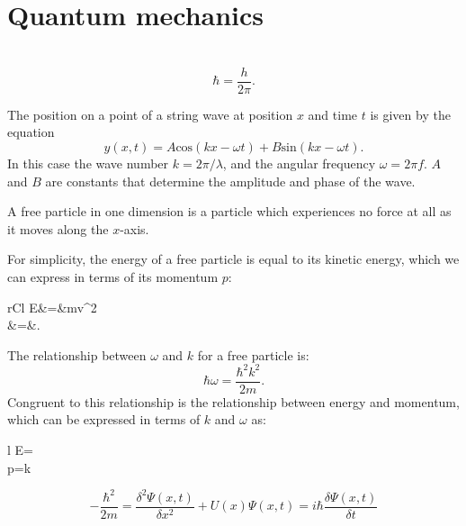 \documentclass[nobib,notoc]{tufte-handout}
\begin{document}
\section{Quantum mechanics}
\begin{defi}
	\,
	\begin{equation*}
		\hbar=\frac{h}{2\pi}.
	\end{equation*}
\end{defi}
\begin{defi}
	The position on a point of a string wave at position \(x\) and time \(t\) is given by the equation
	\begin{equation*}
		y(x,t)=A\text{cos}(kx-\omega t)+B\text{sin}(kx-\omega t).
	\end{equation*}
	In this case the wave number \(k=2\pi/\lambda\), and the angular frequency \(\omega=2\pi f\). \(A\) and \(B\) are constants that determine the amplitude and phase of the wave.
\end{defi}
\begin{defi}
	A free particle in one dimension is a particle which experiences no force at all as it moves along the \(x\)-axis.
\end{defi}
\begin{rema}
	For simplicity, the energy of a free particle is equal to its kinetic energy, which we can express in terms of its momentum \(p\):
	\begin{IEEEeqnarray*}{rCl}
		E&=&mv^2\\
		&=&.
	\end{IEEEeqnarray*}
	The relationship between \(\omega\) and \(k\) for a free particle is:
	\begin{equation*}
		\hbar\omega=\frac{\hbar^2k^2}{2m}.
	\end{equation*}
	Congruent to this relationship is the relationship between energy and momentum, which can be expressed in terms of \(k\) and \(\omega\) as:
	\begin{IEEEeqnarray*}{l}
		E=\hbar\omega\\
		p=\hbar k
	\end{IEEEeqnarray*}
\end{rema}
\begin{defi}
	\begin{equation*}
		-\frac{\hbar^2}{2m}=\frac{\delta^2\Psi(x,t)}{\delta x^2}+U(x)\Psi(x,t)=i\hbar\frac{\delta\Psi(x,t)}{\delta t}
	\end{equation*}
\end{defi}
\end{document}
